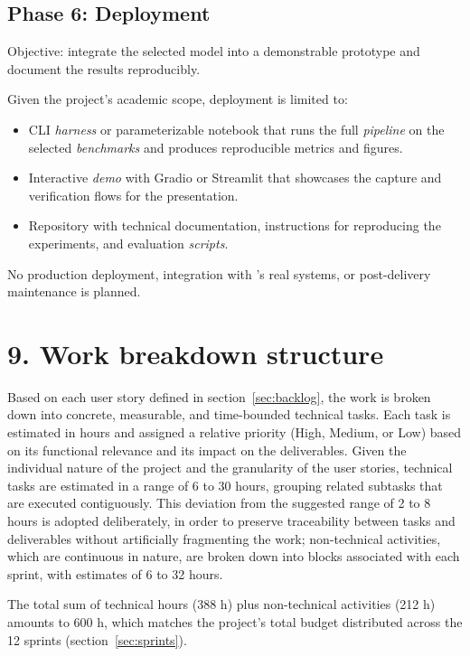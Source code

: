 \documentclass[
  11pt, %
]{charter}
\begin{document}
\subsection{Phase 6: Deployment}

Objective: integrate the selected model into a demonstrable prototype and document the results reproducibly.

Given the project's academic scope, deployment is limited to:

\begin{itemize}
  \item CLI \textit{harness} or parameterizable notebook that runs the full \textit{pipeline} on the selected \textit{benchmarks} and produces reproducible metrics and figures.
  \item Interactive \textit{demo} with Gradio or Streamlit that showcases the capture and verification flows for the presentation.
  \item Repository with technical documentation, instructions for reproducing the experiments, and evaluation \textit{scripts}.
\end{itemize}

No production deployment, integration with \empclientename's\hspace{1px} real systems, or post-delivery maintenance is planned.

\section{9. Work breakdown structure}
\label{sec:wbs}

Based on each user story defined in section~\ref{sec:backlog}, the work is broken down into concrete, measurable, and time-bounded technical tasks. Each task is estimated in hours and assigned a relative priority (High, Medium, or Low) based on its functional relevance and its impact on the deliverables. Given the individual nature of the project and the granularity of the user stories, technical tasks are estimated in a range of 6 to 30 hours, grouping related subtasks that are executed contiguously. This deviation from the suggested range of 2 to 8 hours is adopted deliberately, in order to preserve traceability between tasks and deliverables without artificially fragmenting the work; non-technical activities, which are continuous in nature, are broken down into blocks associated with each sprint, with estimates of 6 to 32 hours.

The total sum of technical hours (388 h) plus non-technical activities (212 h) amounts to 600 h, which matches the project's total budget distributed across the 12 sprints (section~\ref{sec:sprints}).
\end{document}
